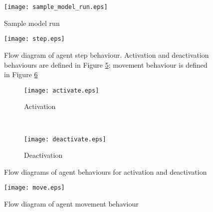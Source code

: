 \begin{figure}[h!]
    \centering
    \texttt{[image: sample\_model\_run.eps]}
    \caption{Sample model run}\label{fig:sample_model_run}
\end{figure}

\begin{figure}[h!]
    \centering
    \texttt{[image: step.eps]}
    \caption{Flow diagram of agent step behaviour. Activation and deactivation
        behaviours are defined in Figure \ref{fig:act_deact}; movement behaviour
    is defined in Figure \ref{fig:move}}\label{fig:step}
\end{figure}

\begin{figure}[h!]
    \centering
    \begin{subfigure}[h]{0.4\textwidth}
        \texttt{[image: activate.eps]}
        \caption{Activation}\label{fig:act_deact:act}
    \end{subfigure}
    ~
    \begin{subfigure}[h]{0.3\textwidth}
        \texttt{[image: deactivate.eps]}
        \caption{Deactivation}\label{fig:act_deact:deact}
    \end{subfigure}
    \caption{Flow diagrams of agent behaviours for activation and deactivation}
    \label{fig:act_deact}
\end{figure}



\begin{figure}[h!]
    \centering
    \texttt{[image: move.eps]}
    \caption{Flow diagram of agent movement behaviour}\label{fig:move}
\end{figure}

